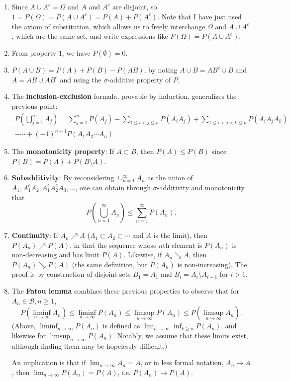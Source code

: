 \documentclass[12pt]{article}
\begin{document}
\begin{enumerate}
\item Since $A \cup A^c = \Omega$ and $A$ and $A^c$ are disjoint, so $1 = P(\Omega) = P(A \cup A^c) = P(A) + P(A^c)$. Note that I have just used the axiom of substitution, which allows us to freely interchange $\Omega$ and $A \cup A^c$, which are the same set, and write expressions like $P(\Omega) = P(A \cup A^c)$.
\item From property $1$, we have $P(\emptyset) = 0$.
\item $P(A \cup B) = P(A) + P(B) - P(AB)$, by noting $A \cup B = AB^c \cup B$ and $A = AB \cup AB^c$ and using the $\sigma$-additive property of $P$.
\item The \textbf{inclusion-exclusion} formula, provable by induction, generalizes the previous point:
\begin{multline*}
P\left( \bigcup_{j = 1}^n A_j \right) = \sum_{j = 1}^n P(A_j) - \sum_{1 \leq i < j \leq n} P(A_i A_j) + \sum_{1 \leq i < j < k \leq n} P(A_i A_j A_k) \\
- \cdots + (-1)^{n + 1} P(A_1 A_2 \cdots A_n)
\end{multline*}
\item The \textbf{monotonicity property}: If $A \subset B$, then $P(A) \leq P(B)$ since $P(B) = P(A) + P(B \setminus A)$.
\item \textbf{Subadditivity}: By reconsidering $\cup_{n = 1}^\infty A_n$ as the union of $A_1, A_1^c A_2, A_1^c A_2^c A_3, \ldots$, one can obtain through $\sigma$-additivity and monotonicity that
\[ P\left( \bigcup_{n = 1}^\infty A_n \right) \leq \sum_{n = 1}^\infty P(A_n). \]
\item \textbf{Continuity}: If $A_n \nearrow A$ ($A_1 \subset A_2 \subset \cdots$ and $A$ is the limit), then $P(A_n) \nearrow P(A)$, in that the sequence whose $n$th element is $P(A_n)$ is non-decreasing and has limit $P(A)$. Likewise, if $A_n \searrow A$, then $P(A_n) \searrow P(A)$ (the same definition, but $P(A_n)$ is non-increasing). The proof is by construction of disjoint sets $B_1 = A_1$ and $B_i = A_i \setminus A_{i - 1}$ for $i > 1$.
\item The \textbf{Fatou lemma} combines these previous properties to observe that for $A_n \in \mathcal B, n \geq 1$,
\[ P(\liminf_{n \to \infty} A_n) \leq \liminf_{n \to \infty} P(A_n) \leq \limsup_{n \to \infty} P(A_n) \leq P(\limsup_{n \to \infty} A_n). \]
(Above, $\liminf_{n \to \infty} P(A_n)$ is defined as $\lim_{n \to \infty} \inf_{k \geq n} P(A_n)$, and likewise for $\limsup_{n \to \infty} P(A_n)$. Notably, we assume that these limits exist, although finding them may be hopelessly difficult.)

An implication is that if $\lim_{n \to \infty} A_n = A$, or in less formal notation, $A_n \to A$, then $\lim_{n \to \infty} P(A_n) = P(A)$, i.e. $P(A_n) \to P(A)$.
\end{enumerate}
\end{document}
